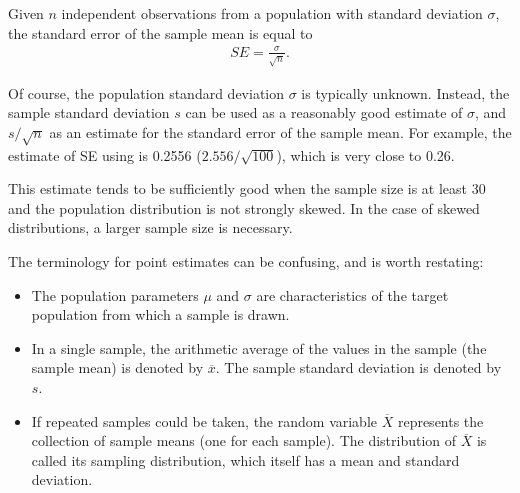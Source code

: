 \begin{spacing}{1.5}


\begin{termBox}{
Given $n$ independent observations from a population with standard deviation $\sigma$, the standard error of the sample mean is equal to \vspace{-1mm}
\begin{align*}
SE = \frac{\sigma}{\sqrt{n}}.
\label{seOfXBar}
\end{align*}\vspace{-3mm}%
}
\end{termBox}

Of course, the population standard deviation $\sigma$ is typically unknown. Instead, the sample standard deviation $s$ can be used as a reasonably good estimate of $\sigma$, and $s / \sqrt{n}$ as an estimate for the standard error of the sample mean. For example, the estimate of SE using  is 0.2556 ($2.556 / \sqrt{100}$), which is very close to 0.26.

This estimate tends to be sufficiently good when the sample size is at least 30 and the population distribution is not strongly skewed. In the case of skewed distributions, a larger sample size is necessary.


The terminology for point estimates can be confusing, and is worth restating:  

\begin{itemize}
\setlength{\itemsep}{0mm}	
	\item The population parameters $\mu$ and $\sigma$ are characteristics of the target population from which a sample is drawn. 
	
	\item In a single sample, the arithmetic average of the values in the sample (the sample mean) is denoted by $\overline{x}$. The sample standard deviation is denoted by $s$. 
	
	\item If repeated samples could be taken, the random variable $\overline{X}$ represents the collection of sample means (one for each sample). The distribution of $\overline{X}$ is called its sampling distribution, which itself has a mean and standard deviation. 
	

\end{itemize}
\end{spacing}
